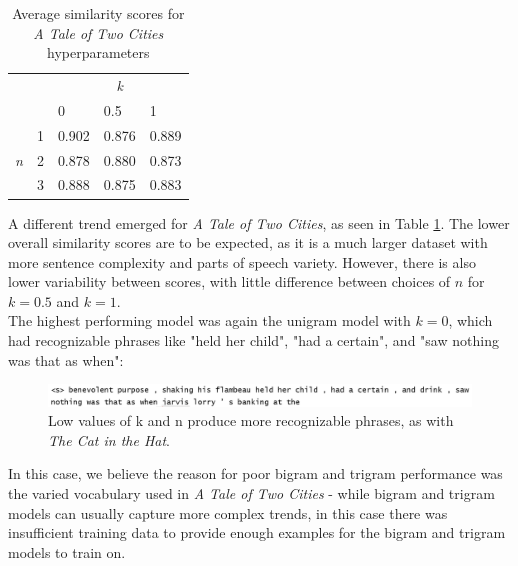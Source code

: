\documentclass[11pt]{article}
\begin{document}
\begin{table}[!ht]
\centering
\begin{tabular}{lllll}
                            &                        & \multicolumn{3}{c}{\textit{k}} \\
                            &                        & 0          & 0.5          & 1         \\ \cline{3-5} 
\multirow{3}{*}{\textit{n}} & \multicolumn{1}{l|}{1} & 0.902          & 0.876            & 0.889         \\
                            & \multicolumn{1}{l|}{2} & 0.878          & 0.880            & 0.873         \\
                            & \multicolumn{1}{l|}{3} & 0.888          & 0.875            & 0.883        
\end{tabular}
\caption{Average similarity scores for \textit{A Tale of Two Cities} hyperparameters}
\label{tab:tale}
\end{table}

A different trend emerged for\textit{ A Tale of Two Cities}, as seen in Table \ref{tab:tale}.  The lower overall similarity scores are to be expected, as it is a much larger dataset with more sentence complexity and parts of speech variety.  However, there is also lower variability between scores, with little difference between choices of $n$ for $k = 0.5$ and $k=1$.\\

The highest performing model was again the unigram model with $k=0$, which had recognizable phrases like "held her child", "had a certain", and "saw nothing was that as when":

\begin{figure}[ht!]
    \centering
    \includegraphics[width=1\textwidth]{goodmodel.png}
    \caption{Low values of k and n produce more recognizable phrases, as with\textit{ The Cat in the Hat}.}
    \label{fig:goodmodel}
\end{figure}

In this case, we believe the reason for poor bigram and trigram performance was the varied vocabulary used in \textit{ A Tale of Two Cities} - while bigram and trigram models can usually capture more complex trends, in this case there was insufficient training data to provide enough examples for the bigram and trigram models to train on.
\end{document}
